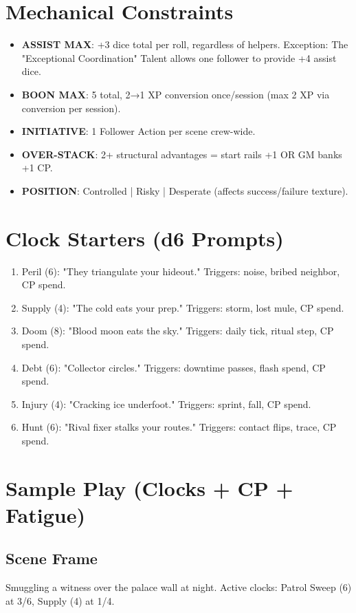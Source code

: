 \section{Mechanical Constraints}
\begin{itemize}
    \item \textbf{ASSIST MAX}: +3 dice total per roll, regardless of helpers. Exception: The "Exceptional Coordination" Talent allows one follower to provide +4 assist dice.
    \item \textbf{BOON MAX}: 5 total, 2→1 XP conversion once/session (max 2 XP via conversion per session).
    \item \textbf{INITIATIVE}: 1 Follower Action per scene crew-wide.
    \item \textbf{OVER-STACK}: 2+ structural advantages = start rails +1 OR GM banks +1 CP.
    \item \textbf{POSITION}: Controlled | Risky | Desperate (affects success/failure texture).
\end{itemize}

\section{Clock Starters (d6 Prompts)}

\begin{enumerate}
\item Peril (6): "They triangulate your hideout." Triggers: noise, bribed neighbor, CP spend.
\item Supply (4): "The cold eats your prep." Triggers: storm, lost mule, CP spend.
\item Doom (8): "Blood moon eats the sky." Triggers: daily tick, ritual step, CP spend.
\item Debt (6): "Collector circles." Triggers: downtime passes, flash spend, CP spend.
\item Injury (4): "Cracking ice underfoot." Triggers: sprint, fall, CP spend.
\item Hunt (6): "Rival fixer stalks your routes." Triggers: contact flips, trace, CP spend.
\end{enumerate}

\section{Sample Play (Clocks + CP + Fatigue)}

\subsection{Scene Frame}
Smuggling a witness over the palace wall at night. Active clocks: Patrol Sweep (6) at 3/6, Supply (4) at 1/4.

